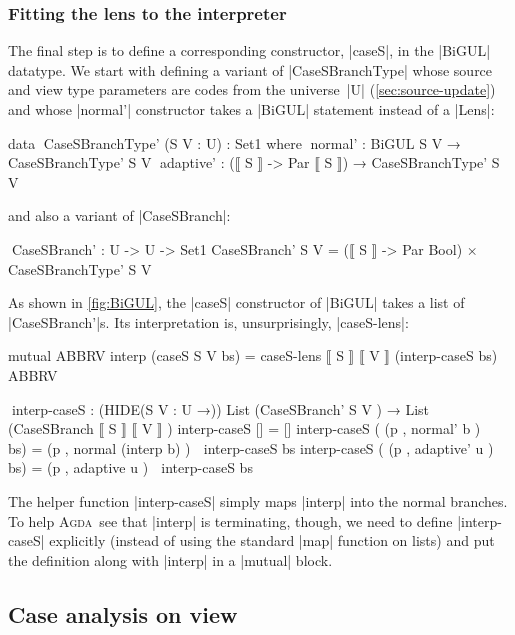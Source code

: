 \documentclass{sigplanconf}
\newcommand{\Agda}{\textsc{Agda}}
\begin{document}
\subsubsection{Fitting the lens to the interpreter}

The final step is to define a corresponding constructor, |caseS|, in the |BiGUL| datatype.
We start with defining a variant of |CaseSBranchType| whose source and view type parameters are codes from the universe~|U| (\autoref{sec:source-update}) and whose |normal'| constructor takes a |BiGUL| statement instead of a |Lens|:
\begin{code}
data ^^^CaseSBranchType' (S V : U) : Set1 where
  ^^^normal'    : BiGUL S V             → CaseSBranchType' S V
  ^^^adaptive'  : (⟦ S ⟧ -> Par ⟦ S ⟧)  → CaseSBranchType' S V
\end{code}
and also a variant of |CaseSBranch|:
\begin{code}
^^^CaseSBranch' : U -> U -> Set1
CaseSBranch' S V =
  (⟦ S ⟧ -> Par Bool) × CaseSBranchType' S V
\end{code}
As shown in \autoref{fig:BiGUL}, the |caseS| constructor of |BiGUL| takes a list of |CaseSBranch'|s.
Its interpretation is, unsurprisingly, |caseS-lens|:
\begin{code}
mutual
  ABBRV
  interp (caseS {S} {V} bs) =
    caseS-lens ⟦ S ⟧ ⟦ V ⟧ (interp-caseS bs)
  ABBRV
  
  ^^^interp-caseS : (HIDE({S V : U} →))  List (CaseSBranch'   S      V    ) →
                                         List (CaseSBranch ⟦  S ⟧ ⟦  V ⟧  )
  interp-caseS []                                    = []
  interp-caseS (  (p , normal'  b           ) ∷ bs)  =
                  (p , normal   (interp b)  ) ∷ interp-caseS bs
  interp-caseS (  (p , adaptive'  u         ) ∷ bs)  =
                  (p , adaptive   u         ) ∷ interp-caseS bs
\end{code}
The helper function |interp-caseS| simply maps |interp| into the normal branches.
To help \Agda\ see that |interp| is terminating, though, we need to define |interp-caseS| explicitly (instead of using the standard |map| function on lists) and put the definition along with |interp| in a |mutual| block.

\subsection{Case analysis on view}
\label{sec:view-case}
\end{document}
